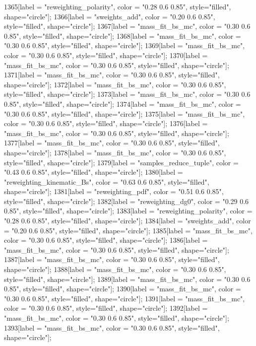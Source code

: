{	1365[label = "reweighting_polarity", color = "0.28 0.6 0.85", style="filled", shape="circle"];
	1366[label = "sweights_add", color = "0.20 0.6 0.85", style="filled", shape="circle"];
	1367[label = "mass_fit_bs_mc", color = "0.30 0.6 0.85", style="filled", shape="circle"];
	1368[label = "mass_fit_bs_mc", color = "0.30 0.6 0.85", style="filled", shape="circle"];
	1369[label = "mass_fit_bs_mc", color = "0.30 0.6 0.85", style="filled", shape="circle"];
	1370[label = "mass_fit_bs_mc", color = "0.30 0.6 0.85", style="filled", shape="circle"];
	1371[label = "mass_fit_bs_mc", color = "0.30 0.6 0.85", style="filled", shape="circle"];
	1372[label = "mass_fit_bs_mc", color = "0.30 0.6 0.85", style="filled", shape="circle"];
	1373[label = "mass_fit_bs_mc", color = "0.30 0.6 0.85", style="filled", shape="circle"];
	1374[label = "mass_fit_bs_mc", color = "0.30 0.6 0.85", style="filled", shape="circle"];
	1375[label = "mass_fit_bs_mc", color = "0.30 0.6 0.85", style="filled", shape="circle"];
	1376[label = "mass_fit_bs_mc", color = "0.30 0.6 0.85", style="filled", shape="circle"];
	1377[label = "mass_fit_bs_mc", color = "0.30 0.6 0.85", style="filled", shape="circle"];
	1378[label = "mass_fit_bs_mc", color = "0.30 0.6 0.85", style="filled", shape="circle"];
	1379[label = "samples_reduce_tuple", color = "0.43 0.6 0.85", style="filled", shape="circle"];
	1380[label = "reweighting_kinematic_Bs", color = "0.63 0.6 0.85", style="filled", shape="circle"];
	1381[label = "reweighting_pdf", color = "0.51 0.6 0.85", style="filled", shape="circle"];
	1382[label = "reweighting_dg0", color = "0.29 0.6 0.85", style="filled", shape="circle"];
	1383[label = "reweighting_polarity", color = "0.28 0.6 0.85", style="filled", shape="circle"];
	1384[label = "sweights_add", color = "0.20 0.6 0.85", style="filled", shape="circle"];
	1385[label = "mass_fit_bs_mc", color = "0.30 0.6 0.85", style="filled", shape="circle"];
	1386[label = "mass_fit_bs_mc", color = "0.30 0.6 0.85", style="filled", shape="circle"];
	1387[label = "mass_fit_bs_mc", color = "0.30 0.6 0.85", style="filled", shape="circle"];
	1388[label = "mass_fit_bs_mc", color = "0.30 0.6 0.85", style="filled", shape="circle"];
	1389[label = "mass_fit_bs_mc", color = "0.30 0.6 0.85", style="filled", shape="circle"];
	1390[label = "mass_fit_bs_mc", color = "0.30 0.6 0.85", style="filled", shape="circle"];
	1391[label = "mass_fit_bs_mc", color = "0.30 0.6 0.85", style="filled", shape="circle"];
	1392[label = "mass_fit_bs_mc", color = "0.30 0.6 0.85", style="filled", shape="circle"];
	1393[label = "mass_fit_bs_mc", color = "0.30 0.6 0.85", style="filled", shape="circle"];
}
